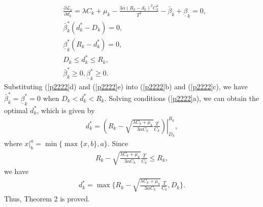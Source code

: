 \documentclass[journal]{IEEEtran}
\begin{document}
	\begin{subequations}\label{p2222}
		\begin{align}
		& \frac{\partial \mathcal L_k }{\partial d_k} =\lambda C_k+\mu_k-\frac{3\alpha \left(R_{k}-d_{k}\right)^2C^3_k}{T^2}-\bar \beta_k+\underline\beta_k=0, \\
		& \bar \beta^*_k(d^*_k-D_k)=0,\\ &\underline\beta^*_k(R_k-d^*_k)=0,\\
		&  D_k \leq d^*_k \leq R_k,\\
		& \bar \beta^*_k\geq 0,\underline\beta^*_k \geq 0.
		\end{align}
	\end{subequations}
	Substituting (\ref{p2222}d) and (\ref{p2222}e) into (\ref{p2222}b) and (\ref{p2222}c), we have $\bar \beta^*_k=\underline\beta^*_k=0$ when $D_k<d^*_k<R_k$.
	Solving conditions (\ref{p2222}a), we can obtain the optimal $d^*_k$, which is given by
	\begin{align}
	d^*_k=\left.\left(R_k-\sqrt{\frac{\lambda C_k+\mu_k}{3\alpha C_k}}\frac{T}{C_k}\right)\right|^{R_k}_{D_k},
	\end{align}
	where $\left.x\right|^a_b=\min\{\max\{x,b\},a\}$.
	Since
	\begin{align}
	R_k-\sqrt{\frac{\lambda C_k+\mu_k}{3\alpha C_k}}\frac{T}{C_k}\leq R_k,
	\end{align}
	we have
	\begin{align}
	d^*_k=\max \{R_k-\sqrt{\frac{\lambda C_k+\mu_k}{3\alpha C_k}}\frac{T}{C_k}, D_k\}.
	\end{align}
	Thus, Theorem 2 is proved.
 
\end{document}
